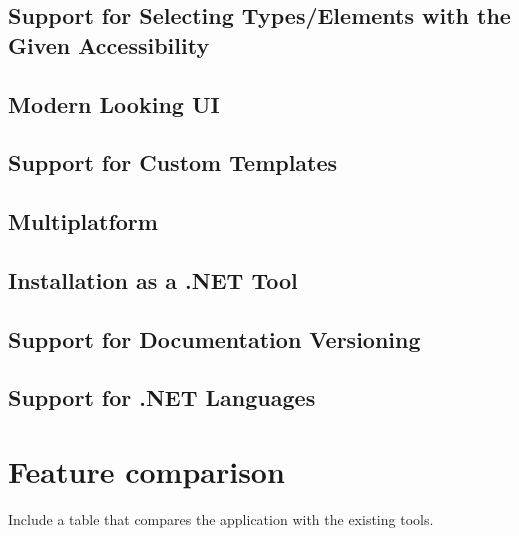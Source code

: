 \subsection{Support for Selecting Types/Elements with the Given Accessibility}
\subsection{Modern Looking UI}
\subsection{Support for Custom Templates}
\subsection{Multiplatform}
\subsection{Installation as a .NET Tool}
\subsection{Support for Documentation Versioning}
\subsection{Support for .NET Languages}

\section{Feature comparison}
Include a table that compares the application with the existing tools.
